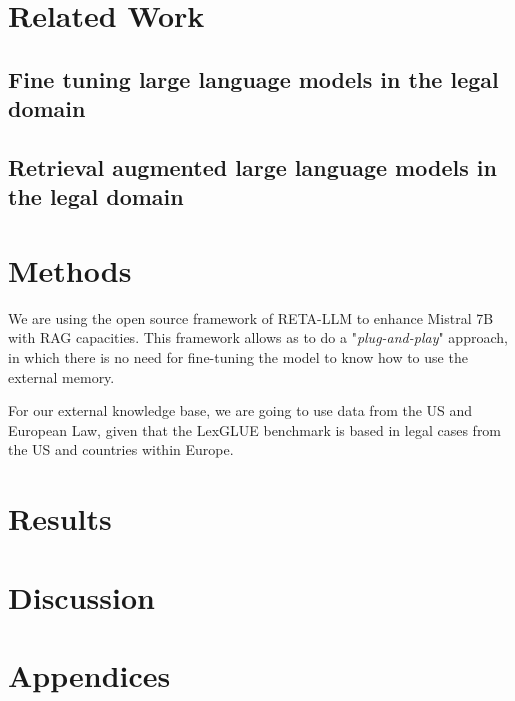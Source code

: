 \documentclass[11pt]{article}
\begin{document}
\section{Related Work}
\subsection{Fine tuning large language models in the legal domain}
\subsection{Retrieval augmented large language models in the legal domain}

\section{Methods}
We are using the open source framework of RETA-LLM \cite{liu2023reta} to enhance Mistral 7B with RAG capacities. This framework allows as to do a "\textit{plug-and-play}" approach, in which there is no need for fine-tuning the model to know how to use the external memory.

For our external knowledge base, we are going to use data from the US and European Law, given that the LexGLUE benchmark is based in legal cases from the US and countries within Europe.


\section{Results}

\section{Discussion}


\section{Appendices}




\appendix
\end{document}
